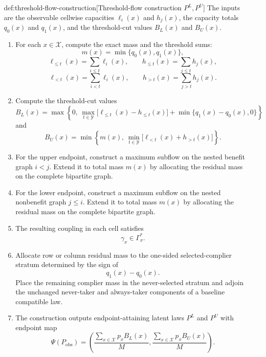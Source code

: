 \begin{algorithmv}{def:threshold-flow-construction}[Threshold-flow construction \(P^L,P^U\)]
The inputs are the observable cellwise capacities \(\ell_i(x)\) and \(h_j(x)\), the capacity totals \(q_0(x)\) and \(q_1(x)\), and the threshold-cut values \(B_L(x)\) and \(B_U(x)\).

\begin{enumerate}
\item For each \(x\in\mathcal X\), compute the exact mass and the threshold sums:
\[
m(x)=\min\{q_0(x),q_1(x)\},
\]
\[
\ell_{\le t}(x)=\sum_{i\le t}\ell_i(x),
\qquad
h_{\le t}(x)=\sum_{j\le t}h_j(x),
\]
\[
\ell_{<t}(x)=\sum_{i<t}\ell_i(x),
\qquad
h_{>t}(x)=\sum_{j>t}h_j(x).
\]

\item Compute the threshold-cut values
\[
B_L(x)
=
\max\left\{
0,\
\max_{t\in\mathcal Y}\bigl[\ell_{\le t}(x)-h_{\le t}(x)\bigr]
+\min\{q_1(x)-q_0(x),0\}
\right\}
\]
and
\[
B_U(x)
=
\min\left\{
m(x),\
\min_{t\in\mathcal Y}\bigl[\ell_{<t}(x)+h_{>t}(x)\bigr]
\right\}.
\]

\item For the upper endpoint, construct a maximum subflow on the nested benefit graph \(i<j\). Extend it to total mass \(m(x)\) by allocating the residual mass on the complete bipartite graph.

\item For the lower endpoint, construct a maximum subflow on the nested nonbenefit graph \(j\le i\). Extend it to total mass \(m(x)\) by allocating the residual mass on the complete bipartite graph.

\item The resulting coupling in each cell satisfies
\[
\gamma_x\in\Gamma_x^{\ast}.
\]

\item Allocate row or column residual mass to the one-sided selected-complier stratum determined by the sign of
\[
q_1(x)-q_0(x).
\]
Place the remaining complier mass in the never-selected stratum and adjoin the unchanged never-taker and always-taker components of a baseline compatible law.

\item The construction outputs endpoint-attaining latent laws \(P^L\) and \(P^U\) with endpoint map
\[
\Psi(P_{\mathrm{obs}})
=
\left(
\frac{\sum_{x\in\mathcal X}p_xB_L(x)}{M},
\frac{\sum_{x\in\mathcal X}p_xB_U(x)}{M}
\right).
\]
\end{enumerate}
\end{algorithmv}

